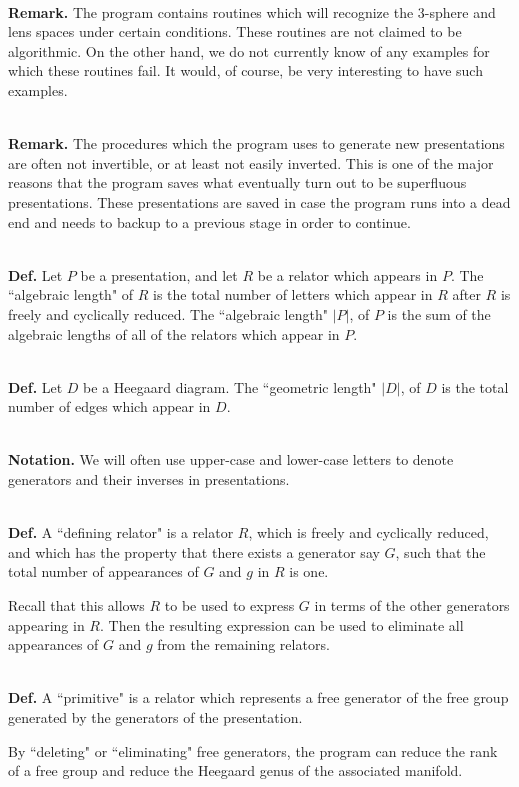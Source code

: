 \documentclass[12pt]{amsart}
\newcommand{\definition}{\ \\ \noindent \textbf{Def.} }
\newcommand{\remark}{\ \\ \noindent \textbf{Remark.} }
\newcommand{\notation}{\ \\ \noindent \textbf{Notation.} }
\begin{document}
\remark The program contains routines which will recognize the 3-sphere and lens spaces under
        certain conditions. These routines are not claimed to be algorithmic. On the other hand,
        we do not currently know of any examples for which these routines fail. It would, of
        course, be very interesting to have such examples.      
                
\remark The procedures which the program uses to generate new presentations are often not
        invertible, or at least not easily inverted. This is one of the major reasons that the
        program saves what eventually turn out to be superfluous presentations. These presentations
        are saved in case the program runs into a dead end and needs to backup to a previous
        stage in order to continue.

\definition     Let $P$ be a presentation, and let $R$ be a relator which appears in $P$. The ``algebraic
        length" of $R$ is the total number of letters which appear in $R$ after $R$ is freely and
        cyclically reduced. The ``algebraic length" $|P|$, of $P$ is the sum of the algebraic lengths
        of all of the relators which appear in $P$.

\definition     Let $D$ be a Heegaard diagram. The ``geometric length" $|D|$, of $D$ is the total number of
        edges which appear in $D$.      

\notation       We will often use upper-case and lower-case letters to denote generators and their
        inverses in presentations.

\definition     A ``defining relator" is a relator $R$, which is freely and cyclically reduced, and which
        has the property that there exists a generator say $G$, such that the total number of
        appearances of $G$ and $g$ in $R$ is one.
        
                Recall that this allows $R$ to be used to express $G$ in terms of the other generators
        appearing in $R$. Then the resulting expression can be used to eliminate all appearances of
        $G$ and $g$ from the remaining relators.

\definition     A ``primitive" is a relator which represents a free generator of the free group
        generated by the generators of the presentation.

                By ``deleting" or ``eliminating" free generators, the program can reduce the rank of
        a free group and reduce the Heegaard genus of the associated manifold.
                                
\end{document}
